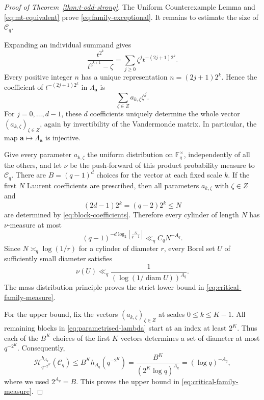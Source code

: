 \documentclass[11pt]{article}
\theoremstyle{remark}
\newcommand{\Haus}{\mathcal{H}}
\begin{document}
\begin{proof}[Proof of Theorem~\ref{thm:t-odd-strong}]
The Uniform Counterexample Lemma and \eqref{eq:mt-equivalent} prove
\eqref{eq:family-exceptional}.  It remains to estimate the size of
$\mathcal C_q$.

Expanding an individual summand gives
\begin{equation} \label{eq:individual-expansion}
 \frac{t^{2^k}}{t^{2^{k+1}}-\zeta}
 =\sum_{j\geq0}\zeta^j t^{-(2j+1)2^k}.
\end{equation}
Every positive integer $n$ has a unique representation
$n=(2j+1)2^k$. Hence the coefficient of $t^{-(2j+1)2^k}$ in
$\Lambda_{\mathbf a}$ is
\begin{equation} \label{eq:block-coefficients}
 \sum_{\zeta\in Z}a_{k,\zeta}\zeta^j.
\end{equation}
For $j=0,\ldots,d-1$, these $d$ coefficients uniquely determine the
whole vector $(a_{k,\zeta})_{\zeta\in Z}$, again by invertibility of
the Vandermonde matrix.  In particular, the map $\mathbf
a\mapsto\Lambda_{\mathbf a}$ is injective.

Give every parameter $a_{k,\zeta}$ the uniform distribution on
$\mathbb F_q^\times$, independently of all the others, and let $\nu$
be the push-forward of this product probability measure to $\mathcal
C_q$.  There are $B=(q-1)^d$ choices for the vector at each fixed
scale $k$.  If the first $N$ Laurent coefficients are prescribed,
then all parameters $a_{k,\zeta}$ with $\zeta\in Z$ and
\begin{equation} \label{eq:visible-blocks}
 (2d-1)2^k=(q-2)2^k\leq N
\end{equation}
are determined by \eqref{eq:block-coefficients}.  Therefore every
cylinder of length $N$ has $\nu$-measure at most
\begin{equation} \label{eq:parameter-cylinder-bound}
(q-1)^{-d\log_2\left\lfloor\frac{N}{q-1}\right\rfloor}\ll_q
C_qN^{-A_q}.
\end{equation}
Since $N\asymp_q\log(1/r)$ for a cylinder of diameter $r$, every
Borel set $U$ of sufficiently small diameter satisfies
\begin{equation} \label{eq:parameter-frostman}
 \nu(U)\ll_q
 \frac1{(\log(1/\operatorname{diam}U))^{A_q}}.
\end{equation}
The mass distribution principle proves the strict lower bound in
\eqref{eq:critical-family-measure}.

For the upper bound, fix the vectors $(a_{k,\zeta})_{\zeta\in Z}$ at
scales $0\le k\le K-1$. All remaining blocks in
\eqref{eq:parametrised-lambda} start at an index at least $2^K$.
Thus each of the $B^K$ choices of the first $K$ vectors determines a
set of diameter at most $q^{-2^K}$. Consequently,
\begin{equation} \label{eq:critical-cover}
 \Haus^{h_{A_q}}_{q^{-2^K}}(\mathcal C_q)
 \leq B^Kh_{A_q}(q^{-2^K})
 =\frac{B^K}{(2^K\log q)^{A_q}}
 =(\log q)^{-A_q},
\end{equation}
where we used $2^{A_q}=B$.  This proves the upper bound in
\eqref{eq:critical-family-measure}.


\end{proof}
\end{document}
